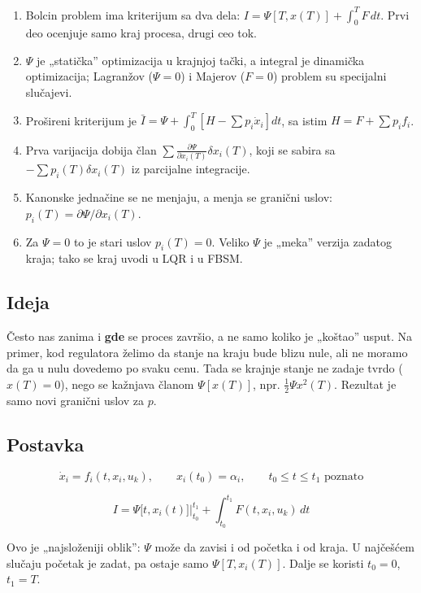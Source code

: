 \documentclass[11pt,a4paper,parskip=half,headsepline,numbers=noenddot]{scrartcl}
\begin{document}
\begin{kljucna}
\begin{enumerate}
\def\labelenumi{\arabic{enumi}.}
\item Bolcin problem ima kriterijum sa dva dela: \(I = \Psi[T, x(T)] + \int_0^T F\,dt\). Prvi deo ocenjuje samo kraj procesa, drugi ceo tok.
\item \(\Psi\) je „statička'' optimizacija u krajnjoj tački, a integral je dinamička optimizacija; Lagranžov (\(\Psi = 0\)) i Majerov (\(F = 0\)) problem su specijalni slučajevi.
\item Prošireni kriterijum je \(\bar I = \Psi + \int_0^T[H - \sum p_i\dot x_i]dt\), sa istim \(H = F + \sum p_i f_i\).
\item Prva varijacija dobija član \(\sum \frac{\partial\Psi}{\partial x_i(T)}\delta x_i(T)\), koji se sabira sa \(-\sum p_i(T)\delta x_i(T)\) iz parcijalne integracije.
\item Kanonske jednačine se ne menjaju, a menja se granični uslov: \(p_i(T) = \partial\Psi/\partial x_i(T)\).
\item Za \(\Psi = 0\) to je stari uslov \(p_i(T) = 0\). Veliko \(\Psi\) je „meka'' verzija zadatog kraja; tako se kraj uvodi u LQR i u FBSM.
\end{enumerate}
\end{kljucna}

\subsection{Ideja}

Često nas zanima i \textbf{gde} se proces završio, a ne samo koliko je „koštao'' usput. Na primer, kod regulatora želimo da stanje na kraju bude blizu nule, ali ne moramo da ga u nulu dovedemo po svaku cenu. Tada se krajnje stanje ne zadaje tvrdo (\(x(T) = 0\)), nego se kažnjava članom \(\Psi[x(T)]\), npr. \(\frac12\Psi x^2(T)\). Rezultat je samo novi granični uslov za \(p\).

\subsection{Postavka}

\[\dot x_i = f_i(t, x_i, u_k), \qquad x_i(t_0) = \alpha_i, \qquad t_0 \le t \le t_1 \text{ poznato}\]

\[I = \Psi\big[t, x_i(t)\big]\Big|_{t_0}^{t_1} + \int_{t_0}^{t_1} F(t, x_i, u_k)\,dt\]

Ovo je „najsloženiji oblik'': \(\Psi\) može da zavisi i od početka i od kraja. U najčešćem slučaju početak je zadat, pa ostaje samo \(\Psi[T, x_i(T)]\). Dalje se koristi \(t_0 = 0\), \(t_1 = T\).
\end{document}
